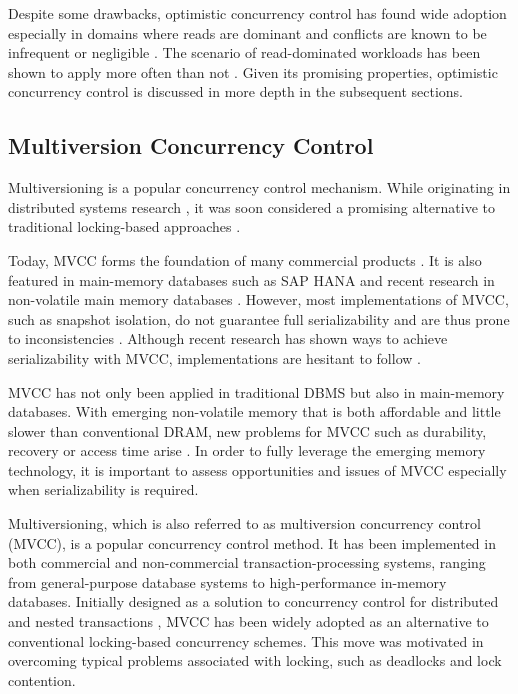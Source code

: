 Despite some drawbacks, optimistic concurrency control has found wide adoption
especially in domains where reads are dominant and conflicts are known to be
infrequent or negligible \cite{carey1986performance, larson2011high,
wu2017empirical}. The scenario of read-dominated workloads has been shown to
apply more often than not \cite{krueger2011fast, andrei2017sap}. Given its
promising properties, optimistic concurrency control is discussed in more depth
in the subsequent sections.

\subsection{Multiversion Concurrency Control}

Multiversioning is a popular concurrency control mechanism. While originating in
distributed systems research \cite{reed1978naming}, it was soon considered a
promising alternative to traditional locking-based approaches
\cite{kung1981optimistic, bernstein1983multiversion, carey1983multiple,
hadzilacos1986algorithmic, carey1986performance}.

Today, MVCC forms the
foundation of many commercial products \cite{larson2011high}. It is also featured in main-memory databases
such as SAP HANA and recent research in non-volatile main memory databases
\cite{lee2013high, schwalb2015efficient, schwalb2016hyrise, oukid2014sofort}.
However, most implementations of MVCC, such as snapshot isolation, do not
guarantee full serializability and are thus prone to inconsistencies
\cite{neumann2015fast, berenson1995critique}. Although recent research has shown
ways to achieve serializability with MVCC, implementations are hesitant to
follow \cite{larson2011high}.

MVCC has not only been applied in traditional DBMS but also in main-memory
databases. With emerging non-volatile memory that is both affordable and little
slower than conventional DRAM, new problems for MVCC such as durability,
recovery or access time arise \cite{bailey2011operating, larson2011high,
oukid2014sofort, schwalb2016hyrise}. In order to fully leverage the emerging
memory technology, it is important to assess opportunities and issues of MVCC
especially when serializability is required.

Multiversioning, which is also referred to as multiversion concurrency control
(MVCC), is a popular concurrency control method. It has been implemented in both
commercial and non-commercial transaction-processing systems, ranging from
general-purpose database systems to high-performance in-memory databases.
Initially designed as a solution to concurrency control for distributed and
nested transactions \cite{reed1978naming}, MVCC has been widely adopted as an
alternative to conventional locking-based concurrency schemes. This move was
motivated in overcoming typical problems associated with locking, such as
deadlocks and lock contention.

